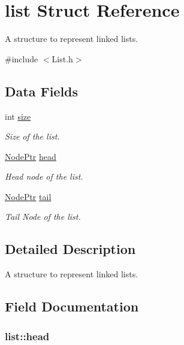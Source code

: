 \hypertarget{structlist}{
\section{list Struct Reference}
\label{structlist}
}


A structure to represent linked lists.  




{\ttfamily \#include $<$List.h$>$}

\subsection*{Data Fields}
\begin{Indent}{\bf }\par
{\em \label{_amgrpd41d8cd98f00b204e9800998ecf8427e}
 }\begin{DoxyCompactItemize}
\item 
int \hyperlink{structlist_a3b03adad0c0429bae9493667ff366dc2}{size}
\begin{DoxyCompactList}\small\item\em Size of the list. \item\end{DoxyCompactList}\item 
\hyperlink{structnode}{NodePtr} \hyperlink{structlist_a357a56cbe66297fb5cc5cd8ba9fa6cf4}{head}
\begin{DoxyCompactList}\small\item\em Head node of the list. \item\end{DoxyCompactList}\item 
\hyperlink{structnode}{NodePtr} \hyperlink{structlist_a7fba27040dab68e2d6acc2885b6df167}{tail}
\begin{DoxyCompactList}\small\item\em Tail Node of the list. \item\end{DoxyCompactList}\end{DoxyCompactItemize}
\end{Indent}


\subsection{Detailed Description}
A structure to represent linked lists. 

\subsection{Field Documentation}
\hypertarget{structlist_a357a56cbe66297fb5cc5cd8ba9fa6cf4}{
\subsubsection[{head}]{ {\bf list::head}}}
\label{structlist_a357a56cbe66297fb5cc5cd8ba9fa6cf4}


